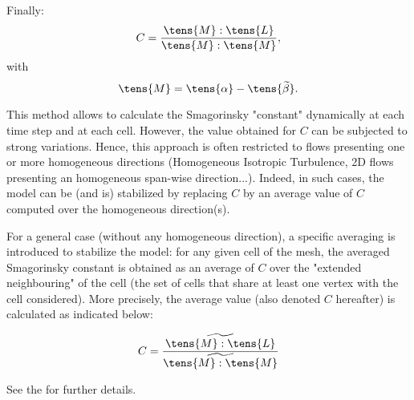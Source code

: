 Finally:
\begin{equation}
C = \frac{ \tens{M} : \tens{L} }{ \tens{M} : \tens{M}},
\end{equation}
with
\begin{equation}
\tens{M} = \tens{\alpha} - \tens{\widetilde{\beta}}.
\end{equation}

This method allows to calculate the Smagorinsky "constant" dynamically at
each time step and at each cell. However, the value obtained for $C$ can be
subjected to strong variations. Hence, this approach is often restricted to
flows presenting one or more homogeneous directions (Homogeneous Isotropic
Turbulence, 2D flows presenting an homogeneous span-wise direction...).
Indeed, in such cases, the model can be (and is) stabilized by replacing $C$
by an average value of $C$ computed over the homogeneous direction(s).

For a general case (without any homogeneous direction), a specific averaging
is introduced to stabilize the model: for any given cell of the mesh, the
averaged Smagorinsky constant is obtained as an average of $C$ over the
"extended neighbouring" of the cell (the set of cells that share at least
one vertex with the cell considered). More precisely, the average value
(also denoted $C$ hereafter) is calculated as indicated below:

\begin{equation}
C = \frac{\widetilde{ \tens{M} : \tens{L}}} {\widetilde{ \tens{M} : \tens{M}}}
\end{equation}

See the  for further details.


